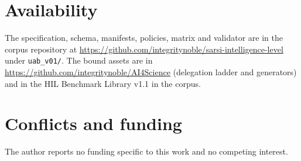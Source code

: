 \section*{Availability}

The specification, schema, manifests, policies, matrix and validator are in the corpus repository at \url{https://github.com/integritynoble/sarsi-intelligence-level} under \texttt{uab\_v01/}. The bound assets are in \url{https://github.com/integritynoble/AI4Science} (delegation ladder and generators) and in the HIL Benchmark Library v1.1 in the corpus.

\section*{Conflicts and funding}

The author reports no funding specific to this work and no competing interest.
